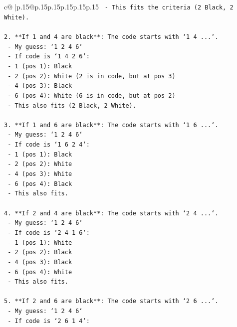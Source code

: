 \documentclass{article}
\begin{document}
{\begin{supertabular}{c@{$\;$}|p{.15\linewidth}@{}p{.15\linewidth}p{.15\linewidth}p{.15\linewidth}p{.15\linewidth}p{.15\linewidth}}
{{{\texttt{    {-} This fits the criteria (2 Black, 2 White).} \\
\\ 
\texttt{2.  **If 1 and 4 are black**: The code starts with `1 4 ...`.} \\
\texttt{    {-} My guess: `1 2 4 6`} \\
\texttt{    {-} If code is `1 4 2 6`:} \\
\texttt{        {-} 1 (pos 1): Black} \\
\texttt{        {-} 2 (pos 2): White (2 is in code, but at pos 3)} \\
\texttt{        {-} 4 (pos 3): Black} \\
\texttt{        {-} 6 (pos 4): White (6 is in code, but at pos 2)} \\
\texttt{    {-} This also fits (2 Black, 2 White).} \\
\\ 
\texttt{3.  **If 1 and 6 are black**: The code starts with `1 6 ...`.} \\
\texttt{    {-} My guess: `1 2 4 6`} \\
\texttt{    {-} If code is `1 6 2 4`:} \\
\texttt{        {-} 1 (pos 1): Black} \\
\texttt{        {-} 2 (pos 2): White} \\
\texttt{        {-} 4 (pos 3): White} \\
\texttt{        {-} 6 (pos 4): Black} \\
\texttt{    {-} This also fits.} \\
\\ 
\texttt{4.  **If 2 and 4 are black**: The code starts with `2 4 ...`.} \\
\texttt{    {-} My guess: `1 2 4 6`} \\
\texttt{    {-} If code is `2 4 1 6`:} \\
\texttt{        {-} 1 (pos 1): White} \\
\texttt{        {-} 2 (pos 2): Black} \\
\texttt{        {-} 4 (pos 3): Black} \\
\texttt{        {-} 6 (pos 4): White} \\
\texttt{    {-} This also fits.} \\
\\ 
\texttt{5.  **If 2 and 6 are black**: The code starts with `2 6 ...`.} \\
\texttt{    {-} My guess: `1 2 4 6`} \\
\texttt{    {-} If code is `2 6 1 4`:} \\
}}}
\end{supertabular}}
\end{document}
